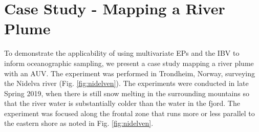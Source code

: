 \documentclass[aoas]{imsart}
\begin{document}
\begin{table}[!h]
    \centering
      \caption{Simulation results for the final mean explained variance $\bR^{2}=100*(1-(\bSigma_{posterior}/\bSigma_{initial}))$).}
    \label{tab:sim_res_r2}
\end{table}

\newpage

\section{Case Study - Mapping a River Plume}
\label{sec:case_study}

To demonstrate the applicability of using multivariate EPs and the IBV
to inform oceanographic sampling, we present a case study mapping a
river plume with an AUV. The experiment was performed in Trondheim,
Norway, surveying the Nidelva river (Fig. \ref{fig:nidelven}). The
experiments were conducted in late Spring 2019, when there is still
snow melting in the surrounding mountains so that the river water is
substantially colder than the water in the fjord. The experiment was
focused along the frontal zone that runs more or less parallel to the
eastern shore as noted in Fig. \ref{fig:nidelven}.
\end{document}
